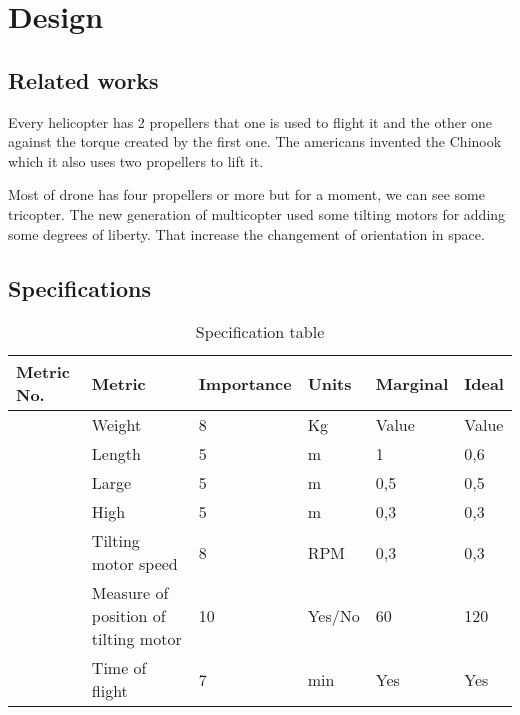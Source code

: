 \chapter{Design}
\label{sec:design}

\section{Related works}

Every helicopter has 2 propellers that one is used to flight it and the other one against the torque created by the first one. 
The americans invented the Chinook which it also uses two propellers to lift it. 

Most of drone has four propellers or more but for a moment, we can see some tricopter. The new generation of multicopter used some tilting motors for adding some degrees of liberty. That increase the changement of orientation in space. 

\section{Specifications}

\begin{table}[h!]
\centering
\begin{tabular}{lp{3.5cm}llll}\toprule
Metric No. & Metric                               & Importance & Units  & Marginal & Ideal \\
\midrule
           & Weight                               & 8          & Kg     & Value    & Value \\
           & Length                               & 5          & m      & 1        & 0,6   \\
           & Large                                & 5          & m      & 0,5      & 0,5   \\
           & High                                 & 5          & m      & 0,3      & 0,3   \\
           & Tilting motor speed                  & 8          & RPM    & 0,3      & 0,3   \\
           & Measure of position of tilting motor & 10         & Yes/No & 60       & 120   \\
           & Time of flight                       & 7          & min    & Yes      & Yes 	\\
\bottomrule 
\end{tabular}
\caption{Specification table}
\label{design:spec}
\end{table}

